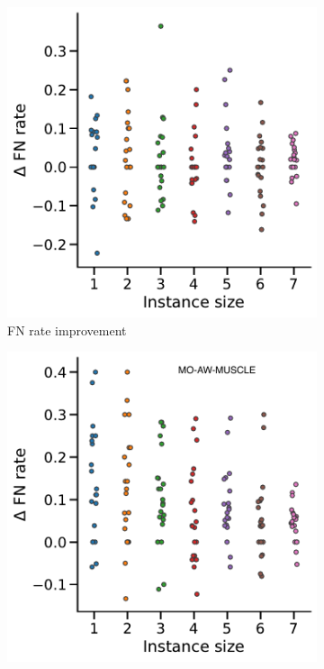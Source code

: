 \begin{figure}[!htbp]
\begin{adjustwidth}{-1.2cm}{}
\begin{subfigure}{0.40\textwidth}
		\end{subfigure}
		\begin{subfigure}{0.40\textwidth} \includegraphics[width=\textwidth]{Figure/delta4-ast} \caption{ FN rate improvement}\label{fig:scatter-ast}\end{subfigure}
		\begin{subfigure}{0.40\textwidth} \includegraphics[width=\textwidth]{Figure/delta4-momuscle} 
		\end{subfigure}
		

\end{adjustwidth}
\end{figure}
